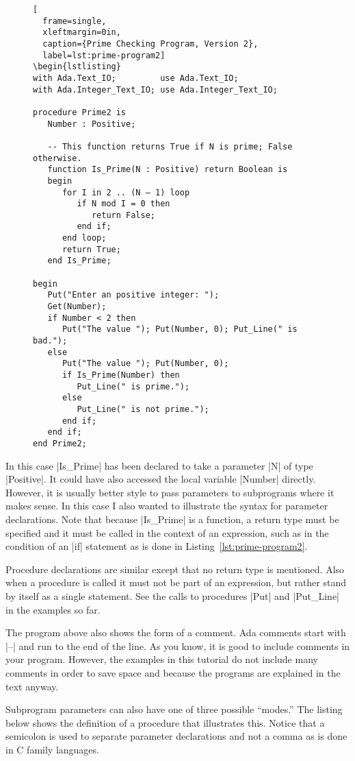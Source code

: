 \begin{figure}[tbhp]
\begin{lstlisting}[
  frame=single,
  xleftmargin=0in,
  caption={Prime Checking Program, Version 2},
  label=lst:prime-program2]
\begin{lstlisting}
with Ada.Text_IO;         use Ada.Text_IO;
with Ada.Integer_Text_IO; use Ada.Integer_Text_IO;

procedure Prime2 is
   Number : Positive;

   -- This function returns True if N is prime; False otherwise.
   function Is_Prime(N : Positive) return Boolean is
   begin
      for I in 2 .. (N – 1) loop
         if N mod I = 0 then
            return False;
         end if;
      end loop;
      return True;
   end Is_Prime;

begin
   Put("Enter an positive integer: ");
   Get(Number);
   if Number < 2 then
      Put("The value "); Put(Number, 0); Put_Line(" is bad.");
   else
      Put("The value "); Put(Number, 0);
      if Is_Prime(Number) then
         Put_Line(" is prime.");
      else
         Put_Line(" is not prime.");
      end if;
   end if;
end Prime2;
\end{lstlisting}
\end{figure}

In this case |Is_Prime| has been declared to take a parameter |N| of type |Positive|. It could
have also accessed the local variable |Number| directly. However, it is usually better style to
pass parameters to subprograms where it makes sense. In this case I also wanted to illustrate
the syntax for parameter declarations. Note that because |Is_Prime| is a function, a return type
must be specified and it must be called in the context of an expression, such as in the
condition of an |if| statement as is done in Listing~\ref{lst:prime-program2}.

Procedure declarations are similar except that no return type is mentioned. Also when a
procedure is called it must not be part of an expression, but rather stand by itself as a single
statement. See the calls to procedures |Put| and |Put_Line| in the examples so far.

The program above also shows the form of a comment. Ada comments start with |--| and run to the
end of the line. As you know, it is good to include comments in your program. However, the
examples in this tutorial do not include many comments in order to save space and because the
programs are explained in the text anyway.

Subprogram parameters can also have one of three possible ``modes.'' The listing below shows the
definition of a procedure that illustrates this. Notice that a semicolon is used to separate
parameter declarations and not a comma as is done in C family languages.


